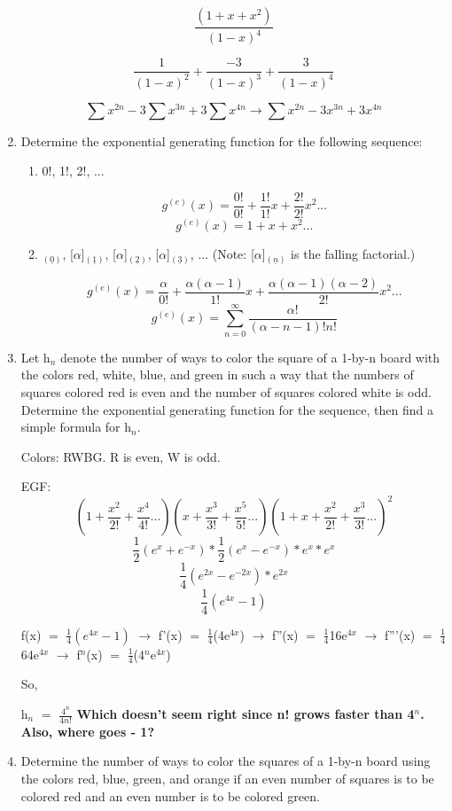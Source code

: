 \documentclass{article}
\newcommand{\mt}[1]{\ensuremath{#1}}
\newcommand{\balist}{\begin{enumerate}[label=\alph*.]}
\newcommand{\elist}{\end{enumerate}}
\newcommand{\afa}{\mt{\alpha} }
\newcommand{\lra}{ \mt{\longrightarrow} } %
\newcommand{\ps}{\mt{+} }
\newcommand{\eql}{\mt{=} }
\newcommand{\uw}[2]{#1\mt{_{#2}}}
\newcommand{\uf}[2]{#1\mt{^{#2}}}
\newcommand{\frc}[2]{\mt{\frac{#1}{#2}}}
\newcommand{\eqn}[1]{\[#1\]}
\newcommand{\ff}[2]{[\mt{#1}]\mt{_{(\underline{#2})}}}
\begin{document}
\begin{enumerate}
   \eqn{\frac{(1 + x + x^2)}{(1 - x)^4}}
   
   \eqn{\frac{1}{(1 - x)^2} + \frac{-3}{(1 - x)^3} + \frac{3}{(1 - x)^4}}
   
   \eqn{\sum x^{2n} - 3\sum x^{3n} + 3\sum x^{4n} \lra \sum x^{2n} - 3x^{3n} + 3x^{4n}}
   
   \item Determine the exponential generating function for the following sequence:
   \balist
   \item 0!, 1!, 2!, ...
   
   \eqn{\uf{g}{(e)}(x) \eql \frac{0!}{0!} + \frac{1!}{1!}x + \frac{2!}{2!}x^2 ... }
   \eqn{\uf{g}{(e)}(x) \eql 1 + x + x^2 ...}
   
   \item \ff{\alpha}{0}, \ff{\alpha}{1}, \ff{\alpha}{2}, \ff{\alpha}{3}, ... (Note: \ff{\alpha}{n} is the falling factorial.)
   
   \eqn{\uf{g}{(e)}(x) \eql \frac{\afa}{0!} + \frac{\afa(\afa - 1)}{1!}x + \frac{\alpha(\alpha - 1)(\alpha - 2)}{2!}x^2 ... }
   \eqn{\uf{g}{(e)}(x) \eql \sum_{n = 0}^{\infty} \frac{\alpha!}{(\alpha - n - 1)!n!}}
   
   
   \elist
   \item Let \uw{h}{n} denote the number of ways to color the square of a 1-by-n board with the colors red, white, blue, and green in such a way that the numbers of squares colored red is even and the number of squares colored white is odd. Determine the exponential generating function for the sequence, then find a simple formula for \uw{h}{n}.
   
   Colors: RWBG. R is even, W is odd.
   
   EGF:
   \eqn{(1 + \frac{x^2}{2!} + \frac{x^4}{4!}...)(x + \frac{x^3}{3!} + \frac{x^5}{5!}...)(1 \ps x \ps \frac{x^2}{2!} + \frac{x^3}{3!}...)^2}
   \eqn{\frac{1}{2}(e^x + e^{-x}) * \frac{1}{2}(e^x - e^{-x}) * e^x * e^x}
   \eqn{\frac{1}{4}(e^{2x} - e^{-2x})* e^{2x}}
   \eqn{\frac{1}{4}(e^{4x} - 1)}
   
   f(x) \eql \mt{\frac{1}{4}(e^{4x} - 1)} \lra f'(x) \eql \frc{1}{4}(4\uf{e}{4x}) \lra f''(x) \eql \frc{1}{4}16\uf{e}{4x} \lra f'''(x) \eql \frc{1}{4}64\uf{e}{4x} \lra \uf{f}{n}(x) \eql \frc{1}{4}(\uf{4}{n}\uf{e}{4x})
   
   So,
   
   \uw{h}{n} \eql \frc{4^n}{4n!} \textbf{Which doesn't seem right since n! grows faster than \uf{4}{n}. Also, where goes - 1?}
   
   
   \item Determine the number of ways to color the squares of a 1-by-n board using the colors red, blue, green, and orange if an even number of squares is to be colored red and an even number is to be colored green.
   

\end{enumerate}
\end{document}
